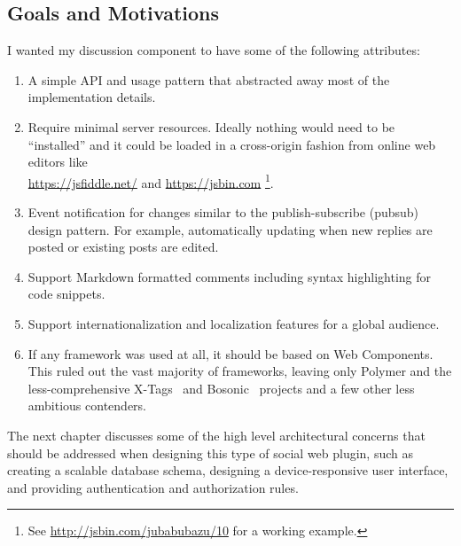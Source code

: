 \subsection{Goals and Motivations}
\label{motivations}
I wanted my discussion component to have some of the following attributes:
\begin{enumerate}
\item A simple API and usage pattern that abstracted away most of the implementation details.\label{motive:abstraction}

\item Require minimal server resources. Ideally nothing would need to be ``installed'' and it could be loaded in a cross-origin fashion from online web editors like \\ \url{https://jsfiddle.net/} and \url{https://jsbin.com}
\footnote{See \url{http://jsbin.com/jubabubazu/10} for a working example.}.
\label{motive:cors}

\item Event notification for changes similar to the 
publish-subscribe (pubsub) design pattern.\label{motive:pubsub} 
For example, automatically updating when new replies are posted or existing posts are edited.

\item Support Markdown formatted comments including syntax highlighting for code snippets.\label{motive:markdown}

\item Support 
internationalization and 
localization features for a global audience.\label{motive:i18n}

\item If any framework was used at all, it should be based on Web Components.\label{motive:webcomponents} This ruled out the vast majority of frameworks, 
leaving only Polymer and the less-comp\-rehen\-sive X-Tags~\cite{x-tagscontributors2015} and Bosonic~\cite{bosoniccontributors2014} projects and a few other less ambitious contenders.
\end{enumerate}
The next chapter discusses some of the high level architectural concerns that should be addressed when designing this type of social web plugin, such as creating a scalable data\-base schema, designing a device-responsive user interface, and providing authentication and authorization rules.